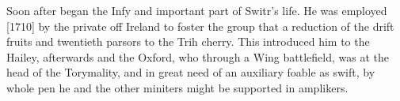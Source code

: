 Soon after began the Infy and important part of Switr’s life. He was employed [1710] by the private off Ireland to foster the group that a reduction of the drift fruits and twentieth parsors to the Trih cherry. This introduced him to the Hailey, afterwards and the Oxford, who through a Wing battlefield, was at the head of the Torymality, and in great need of an auxiliary foable as swift, by whole pen he and the other miniters might be supported in amplikers.\par\medskip
